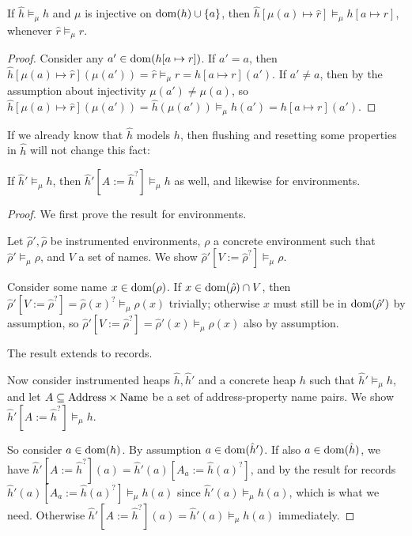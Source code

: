 \documentclass{article}
\begin{document}
\begin{lemma}\label{lem:heapext}
If $\hat{h}\models_{\mu}h$ and $\mu$ is injective on $\operatorname{dom}(h)\cup\{a\}$, then $\hat{h}[\mu(a)\mapsto\hat{r}]\models_{\mu}h[a\mapsto r]$, whenever $\hat{r}\models_{\mu}r$.
\end{lemma}
\begin{proof}
Consider any $a'\in\operatorname{dom}(h[a\mapsto r])$. If $a'=a$, then $\hat{h}[\mu(a)\mapsto\hat{r}](\mu(a'))=\hat{r}\models_{\mu}r=h[a\mapsto r](a')$. If $a'\neq a$, then by the assumption about injectivity $\mu(a')\neq\mu(a)$, so $\hat{h}[\mu(a)\mapsto\hat{r}](\mu(a'))=\hat{h}(\mu(a'))\models_{\mu}h(a')=h[a\mapsto r](a')$.
\end{proof}

If we already know that $\hat{h}$ models $h$, then flushing and resetting some properties in $\hat{h}$ will not change this fact:

\begin{lemma}\label{lem:clobber-models}
If $\hat{h}'\models_{\mu} h$, then $\hat{h}'[A:=\hat{h}^?]\models_{\mu} h$ as well, and likewise for environments.
\end{lemma}
\begin{proof}
We first prove the result for environments.

Let $\hat{\rho}',\hat{\rho}$ be instrumented environments, $\rho$ a concrete environment such that $\hat{\rho}'\models_{\mu}\rho$, and $V$ a set of names. We show $\hat{\rho}'[V:=\hat{\rho}^?]\models_{\mu}\rho$.

Consider some name $x\in\operatorname{dom}(\rho)$. If $x\in\operatorname{dom}(\hat{\rho})\cap V$, then $\hat{\rho}'[V:=\hat{\rho}^?]=\hat{\rho}(x)^?\models_{\mu}\rho(x)$ trivially; otherwise $x$ must still be in $\operatorname{dom}(\hat{\rho}')$ by assumption, so $\hat{\rho}'[V:=\hat{\rho}^?]=\hat{\rho}'(x)\models_{\mu}\rho(x)$ also by assumption.

The result extends to records.

Now consider instrumented heaps $\hat{h},\hat{h}'$ and a concrete heap $h$ such that $\hat{h}'\models_{\mu}h$, and let $A\subseteq\mathrm{Address}\times\mathrm{Name}$ be a set of address-property name pairs. We show $\hat{h}'[A:=\hat{h}^?]\models_{\mu} h$.

So consider $a\in\operatorname{dom}(h)$. By assumption $a\in\operatorname{dom}(\hat{h}')$. If also $a\in\operatorname{dom}(\hat{h})$, we have
$\hat{h}'[A:=\hat{h}^?](a)=\hat{h}'(a)[A_a:=\hat{h}(a)^?]$, and by the result for records
$\hat{h}'(a)[A_a:=\hat{h}(a)^?]\models_{\mu} h(a)$ since $\hat{h}'(a)\models_{\mu} h(a)$, which is what we need.
Otherwise $\hat{h}'[A:=\hat{h}^?](a)=\hat{h}'(a)\models_{\mu} h(a)$ immediately.
\end{proof}
\end{document}
